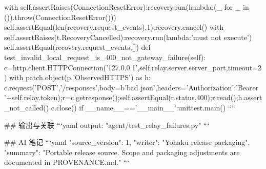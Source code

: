   with self.assertRaises(ConnectionResetError):recovery.run(lambda:(_ for _ in ()).throw(ConnectionResetError()))
  self.assertEqual(len(recovery.request_events),1);recovery.cancel()
  with self.assertRaises(t.RecoveryCancelled):recovery.run(lambda:'must not execute')
  self.assertEqual(recovery.request_events,[])
 def test_invalid_local_request_is_400_not_gateway_failure(self):
  c=http.client.HTTPConnection('127.0.0.1',self.relay.server.server_port,timeout=2)
  with patch.object(p,'ObservedHTTPS') as h:
   c.request('POST','/responses',body=b'bad json',headers={'Authorization':'Bearer '+self.relay.token});r=c.getresponse();self.assertEqual(r.status,400);r.read();h.assert_not_called()
  c.close()
if __name__=='__main__':unittest.main()
````

## 输出与关联
```yaml
output: "agent/test_relay_failures.py"
```

## AI 笔记
```yaml
{"source_version": 1, "writer": "Yohaku release packaging", "summary": "Portable release source. Scope and packaging adjustments are documented in PROVENANCE.md."}
```
